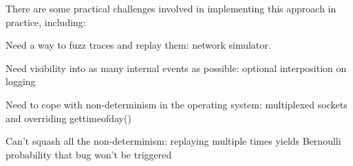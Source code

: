 There are some practical challenges involved in implementing this approach in
practice, including:

Need a way to fuzz traces and replay them: network simulator.

Need visibility into as many internal events as possible: optional
interposition on logging

Need to cope with non-determinism in the operating system: multiplexed sockets
and overriding gettimeofday()

Can't squash all the non-determinism: replaying multiple times yields
Bernoulli probability that bug won’t be triggered
